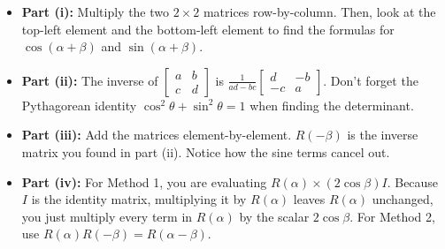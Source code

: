 \begin{hint}
\begin{itemize}
    \item \textbf{Part (i):} Multiply the two $2 \times 2$ matrices row-by-column. Then, look at the top-left element and the bottom-left element to find the formulas for $\cos(\alpha+\beta)$ and $\sin(\alpha+\beta)$.
    \item \textbf{Part (ii):} The inverse of $\begin{bmatrix} a & b \\ c & d \end{bmatrix}$ is $\frac{1}{ad-bc}\begin{bmatrix} d & -b \\ -c & a \end{bmatrix}$. Don't forget the Pythagorean identity $\cos^2\theta + \sin^2\theta = 1$ when finding the determinant.
    \item \textbf{Part (iii):} Add the matrices element-by-element. $R(-\beta)$ is the inverse matrix you found in part (ii). Notice how the sine terms cancel out.
    \item \textbf{Part (iv):} For Method 1, you are evaluating $R(\alpha) \times (2\cos\beta)I$. Because $I$ is the identity matrix, multiplying it by $R(\alpha)$ leaves $R(\alpha)$ unchanged, you just multiply every term in $R(\alpha)$ by the scalar $2\cos\beta$. For Method 2, use $R(\alpha)R(-\beta) = R(\alpha-\beta)$.
\end{itemize}
\end{hint}

